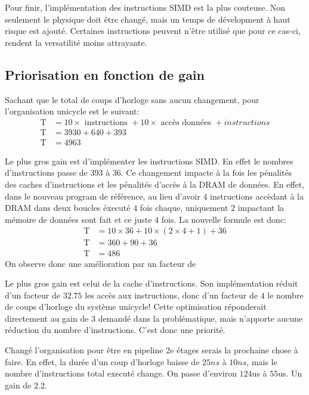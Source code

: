 \documentclass[a11paper]{article}
\newcommand{\todo}[1]{\begin{color}{Red}\textbf{TODO:} #1\end{color}}
\begin{document}
Pour finir, l'implémentation des instructions SIMD est la plus couteuse.
Non seulement le physique doit être changé, mais un temps de dévelopment à
haut risque est ajouté. Certaines instructions peuvent n'être utilisé que pour
ce cas-ci, rendent la versatilité moins attrayante.

\subsection{Priorisation en fonction de gain}
Sachant que le total de coups d'horloge sans aucun changement, pour
l'organisation unicycle est le suivant:
\begin{align}
  \text{T} &= 10\times\text{ instructions } + 10\times\text{ accès données } + instructions \\
  \text{T} &= 3930 + 640 + 393 \\
  \text{T} &= 4963
\end{align}

Le plus gros gain est d'implémenter les instructions SIMD. En effet le nombres
d'instructions passe de $393$ à $36$. Ce changement impacte à la fois les
pénalités des caches d'instructions et les pénalités d'accès à la DRAM de
données. En effet, dans le nouveau program de référence, au lieu d'avoir $4$
instructions accèdant à la DRAM dans deux boucles éxecuté $4$ fois chaque,
uniquement $2$ impactant la mémoire de données sont fait et ce juste $4$ fois.
La nouvelle formule est donc:
\begin{align}
  \text{T} &= 10\times36 + 10\times(2\times4+1) + 36 \\
  \text{T} &= 360 + 90 + 36 \\
  \text{T} &= 486
\end{align}
On observe donc une amélioration par un facteur de


Le plus gros gain est celui de la cache d'instructions. Son implémentation
réduit d'un facteur de $32.75$ les accès aux instructions, donc d'un facteur
de $4$ le nombre de coups d'horloge du système unicycle! Cette optimisation
réponderait directement au gain de $3$ demandé dans la problématique, mais
n'apporte aucune réduction du nombre d'instructions. C'est donc une priorité.

Changé l'organisation pour être en pipeline 2e étages serais la prochaine chose
à faire. En effet, la durée d'un coup d'horloge baisse de $25ns$ à $10ns$, mais
le nombre d'instructions total executé change. On passe d'environ $124$us à
$55$us. Un gain de $2.2$.

\end{document}

